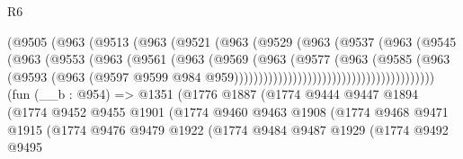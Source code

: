 \begin{lexlean}{R6}
\begin{coremodule}
                                    (@9505
                                      (@963
                                        (@9513
                                          (@963
                                            (@9521
                                              (@963
                                                (@9529
                                                  (@963
                                                    (@9537
                                                      (@963
                                                        (@9545
                                                          (@963
                                                            (@9553
                                                              (@963
                                                                (@9561
                                                                  (@963
                                                                    (@9569
                                                                      (@963
                                                                        (@9577
                                                                          (@963
                                                                            (@9585
                                                                              (@963
                                                                                (@9593
                                                                                  (@963
                                                                                    (@9597
                                                                                      @9599
                                                                                      @984
                                                                                      @959)))))))))))))))))))))))))))))))))))))))))
    (fun (__b : @954) =>
    @1351
      (@1776
        @1887
        (@1774
          @9444
          @9447
          @1894
          (@1774
            @9452
            @9455
            @1901
            (@1774
              @9460
              @9463
              @1908
              (@1774
                @9468
                @9471
                @1915
                (@1774
                  @9476
                  @9479
                  @1922
                  (@1774
                    @9484
                    @9487
                    @1929
                    (@1774
                      @9492
                      @9495

\end{coremodule}
\end{lexlean}

